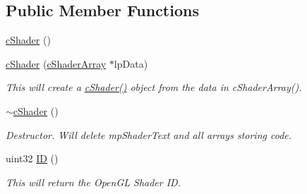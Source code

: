 \subsection*{Public Member Functions}
\begin{DoxyCompactItemize}
\item 
\hyperlink{classc_shader_afcc7888bfedc05147b87a0de3f284751}{cShader} ()
\item 
\hyperlink{classc_shader_a8597568fcc7f57d7b7e9fdf722b510a8}{cShader} (\hyperlink{classc_shader_array}{cShaderArray} $\ast$lpData)
\begin{DoxyCompactList}\small\item\em This will create a \hyperlink{classc_shader_afcc7888bfedc05147b87a0de3f284751}{cShader()} object from the data in cShaderArray(). \item\end{DoxyCompactList}\item 
\hyperlink{classc_shader_a091f495e391cfbb10db9736a45499ba7}{$\sim$cShader} ()
\begin{DoxyCompactList}\small\item\em Destructor. Will delete mpShaderText and all arrays storing code. \item\end{DoxyCompactList}\item 
uint32 \hyperlink{classc_shader_ad1f607d218af039dc474b41faf0f8c02}{ID} ()
\begin{DoxyCompactList}\small\item\em This will return the OpenGL Shader ID. \item\end{DoxyCompactList}\end{DoxyCompactItemize}

